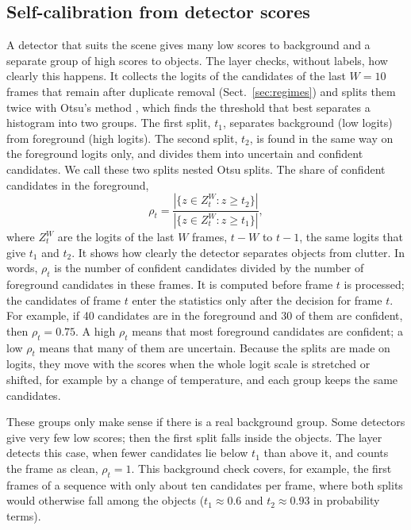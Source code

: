 \subsection{Self-calibration from detector scores}\label{sec:calib}
A detector that suits the scene gives many low scores to background and a
separate group of high scores to objects. The layer checks, without labels,
how clearly this happens. It collects the logits of the candidates of the
last $W=10$ frames that remain after duplicate removal
(Sect.~\ref{sec:regimes}) and splits them twice with Otsu's method \cite{otsu1979},
which finds the threshold that best separates a histogram into two groups.
The first split, $t_1$, separates background (low logits) from foreground
(high logits). The second split, $t_2$, is found in the same way on the
foreground logits only, and divides them into uncertain and confident
candidates. We call these two splits nested Otsu splits.
The share of confident candidates in the foreground,
\begin{equation}
\rho_t=\frac{\left|\{z\in Z_t^W: z\ge t_2\}\right|}{\left|\{z\in Z_t^W: z\ge t_1\}\right|},
\label{eq:rho}
\end{equation}
where $Z_t^W$ are the logits of the last $W$ frames, $t-W$ to $t-1$, the same
logits that give $t_1$ and $t_2$. It shows how clearly the detector separates
objects from clutter. In words, $\rho_t$ is the number of confident candidates
divided by the number of foreground candidates in these frames. It is computed
before frame $t$ is processed; the candidates of frame $t$ enter the
statistics only after the decision for frame $t$. For example, if 40 candidates are in the foreground
and 30 of them are confident, then $\rho_t=0.75$. A high $\rho_t$ means that most foreground candidates are confident; a low $\rho_t$
means that many of them are uncertain. Because the splits are made on
logits, they move with the scores when the whole logit scale is stretched or
shifted, for example by a change of temperature, and each group keeps the
same candidates.

These groups only make sense if there is a real background group. Some
detectors give very few low scores; then the first split falls inside the
objects. The layer detects this case, when fewer candidates lie below $t_1$
than above it, and counts the frame as clean, $\rho_t=1$. This background
check covers, for example, the first frames of a sequence with only about
ten candidates per frame, where both splits would otherwise fall among the
objects ($t_1\approx0.6$ and $t_2\approx0.93$ in probability terms).

